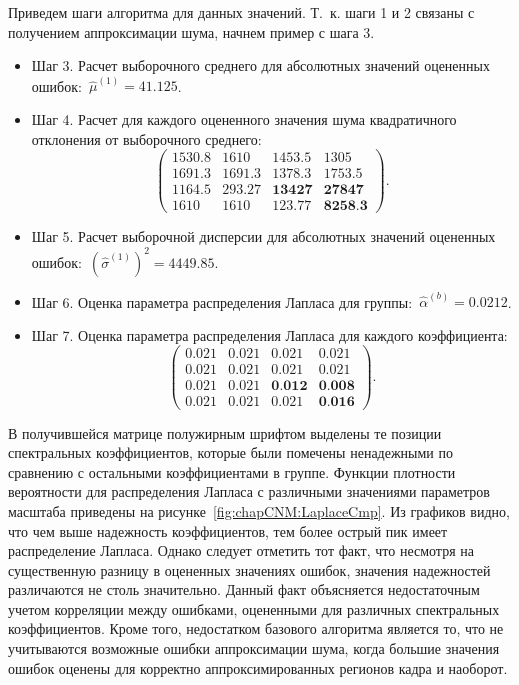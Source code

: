 Приведем шаги алгоритма для данных значений. Т.~к. шаги 1 и 2 связаны с получением аппроксимации шума, начнем пример с шага 3.
\begin{itemize}
    \item Шаг 3. Расчет выборочного среднего для абсолютных значений оцененных ошибок:~$\hat{\mu}^{(1)}=41.125$.
    \item Шаг 4. Расчет для каждого оцененного значения шума квадратичного отклонения от выборочного среднего:
    \begin{equation}
        \left(
        \begin{matrix}
           1530.8  & 1610   & 1453.5 & 1305 \\
           1691.3  & 1691.3 & 1378.3 & 1753.5 \\
           1164.5  & 293.27 & \textbf{13427}  & \textbf{27847} \\
           1610    & 1610   & 123.77 & \textbf{8258.3}
        \end{matrix}
        \right).
    \end{equation}
    \item Шаг 5. Расчет выборочной дисперсии для абсолютных значений оцененных ошибок:~$\left(\hat{\sigma}^{(1)}\right)^2 = 4449.85$.
    \item Шаг 6. Оценка параметра распределения Лапласа для группы:~$\hat{\alpha}^{(b)} = 0.0212$.
    \item Шаг 7. Оценка параметра распределения Лапласа для каждого коэффициента:
    \begin{equation}
        \left(
        \begin{matrix}
            0.021 & 0.021 & 0.021 & 0.021 \\
            0.021 & 0.021 & 0.021 & 0.021 \\
            0.021 & 0.021 & \textbf{0.012} & \textbf{0.008} \\
            0.021 & 0.021 & 0.021 & \textbf{0.016}
        \end{matrix}
        \right).
    \end{equation}
\end{itemize}

В получившейся матрице полужирным шрифтом выделены те позиции спектральных коэффициентов, которые были помечены ненадежными по сравнению с остальными коэффициентами в группе. Функции плотности вероятности для распределения Лапласа с различными значениями параметров масштаба приведены на рисунке~\ref{fig:chapCNM:LaplaceCmp}. Из графиков видно, что чем выше надежность коэффициентов, тем более острый пик имеет распределение Лапласа. Однако следует отметить тот факт, что несмотря на существенную разницу в оцененных значениях ошибок, значения надежностей различаются не столь значительно. Данный факт объясняется недостаточным учетом корреляции между ошибками, оцененными для различных спектральных коэффициентов. Кроме того, недостатком базового алгоритма является то, что не учитываются возможные ошибки аппроксимации шума, когда большие значения ошибок оценены для корректно аппроксимированных регионов кадра и наоборот.

